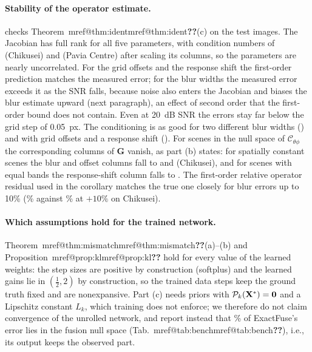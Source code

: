 \documentclass[10pt,twocolumn,letterpaper]{article}
\makeatletter
\newcommand{\mref}[1]{\ifcsname mref@#1\endcsname\csname mref@#1\endcsname\else\textbf{??}\fi}
\makeatother
\begin{document}
\paragraph{Stability of the operator estimate.}  checks Theorem~\mref{thm:ident}(c) on the test images. The Jacobian has full rank for all five parameters, with condition numbers of  (Chikusei) and  (Pavia Centre) after scaling its columns, so the parameters are nearly uncorrelated. For the grid offsets and the response shift the first-order prediction matches the measured error; for the blur widths the measured error exceeds it as the SNR falls, because noise also enters the Jacobian and biases the blur estimate upward (next paragraph), an effect of second order that the first-order bound does not contain. Even at 20~dB SNR the errors stay far below the grid step of 0.05~px. The conditioning is as good for two different blur widths () and with grid offsets and a response shift (). For scenes in the null space of $\mathcal{C}_{\theta\phi}$ the corresponding columns of $\mathbf{G}$ vanish, as part (b) states: for spatially constant scenes the blur and offset columns fall to  and  (Chikusei), and for scenes with equal bands the response-shift column falls to . The first-order relative operator residual used in the corollary matches the true one closely for blur errors up to 10\% (\% against \% at $+10\%$ on Chikusei).

\paragraph{Which assumptions hold for the trained network.} Theorem~\mref{thm:mismatch}(a)--(b) and Proposition~\mref{prop:kl} hold for every value of the learned weights: the step sizes are positive by construction (softplus) and the learned gains lie in $(\tfrac12,2)$ by construction, so the trained data steps keep the ground truth fixed and are nonexpansive. Part (c) needs priors with $\mathcal{P}_k(\mathbf{X}^*)=\mathbf{0}$ and a Lipschitz constant $L_k$, which training does not enforce; we therefore do not claim convergence of the unrolled network, and report instead that \% of ExactFuse's error lies in the fusion null space (Tab.~\mref{tab:bench}), i.e., its output keeps the observed part.
\end{document}
